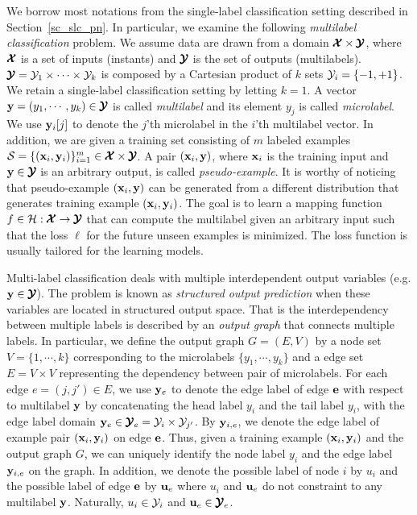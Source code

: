 {We borrow most notations from the single-label classification setting described in Section~\ref{sc_slc_pn}.
In particular, we examine the following \textit{multilabel classification} problem.
We assume data are drawn from a domain $\pmb {\mathcal{X}}\times\pmb {\mathcal{Y}}$, where $\pmb {\mathcal{X}}$ is a set of inputs (instants) and $\pmb {\mathcal{Y}}$ is the set of outputs (multilabels).
$\pmb {\mathcal{Y}} = \mathcal{Y}_1\times\cdots\times\mathcal{Y}_k$ is composed by a Cartesian product of $k$ sets $\mathcal{Y}_i=\{-1,+1\}$.
We retain a single-label classification setting by letting $k=1$.
A vector $\mathbf {y}=(y_1,\cdots,y_k)\in\pmb {\mathcal{Y}}$ is called \textit{multilabel} and its element $y_j$ is called \textit{microlabel}.
We use $\mathbf {y}_i[j]$ to denote the $j$'th microlabel in the $i$'th multilabel vector.
In addition, we are given a training set consisting of $m$ labeled examples $\mathcal{S}=\{(\mathbf {x}_i,\mathbf {y}_i)\}_{i=1}^{m}\in\pmb {\mathcal{X}}\times\pmb {\mathcal{Y}}$. 
A pair $(\mathbf {x}_i,\mathbf {y})$, where $\mathbf {x}_i$ is the training input and $\mathbf {y}\in\pmb {\mathcal{Y}}$ is an arbitrary output, is called \textit{pseudo-example}.
It is worthy of noticing that pseudo-example $(\mathbf {x}_i,\mathbf {y})$ can be generated from a different distribution that generates training example $(\mathbf {x}_i,\mathbf {y}_i)$.
The goal is to learn a mapping function $f\in\mathcal{H}:\pmb {\mathcal{X}}\rightarrow\pmb {\mathcal{Y}}$ that can compute the multilabel given an arbitrary input such that the loss $\ell$ for the future unseen examples is minimized.
The loss function is usually tailored for the learning models.

Multi-label classification deals with multiple interdependent output variables (e.g. $\mathbf {y}\in\pmb {\mathcal{Y}}$).
The problem is known as \textit{structured output prediction} when these variables are located in structured output space.
That is the interdependency between multiple labels is described by an \textit{output graph} that connects multiple labels.
In particular, we define the output graph $G=(E,V)$ by a node set $V=\{1,\cdots,k\}$ corresponding to the microlabels $\{y_1,\cdots,y_k\}$ and a edge set $E=V\times V$ representing the dependency between pair of microlabels.
For each edge $e=(j,j')\in E$, we use $\mathbf {y}_e$ to denote the edge label of edge $\mathbf {e}$ with respect to multilabel $\mathbf {y}$ by concatenating the head label $y_i$ and the tail label $y_i$, with the edge label domain $\mathbf {y}_e\in\pmb {\mathcal{Y}}_e=\mathcal{Y}_i\times\mathcal{Y}_{j'}$.
By $\mathbf {y}_{i,e}$, we denote the edge label of example pair $(\mathbf {x}_i,\mathbf {y}_i)$ on edge $\mathbf {e}$.
Thus, given a training example $(\mathbf {x}_i,\mathbf {y}_i)$ and the output graph $G$, we can uniquely identify the node label $y_i$ and the edge label $\mathbf {y}_{i,e}$ on the graph.
In addition, we denote the possible label of node $i$ by $u_i$ and the possible label of edge $\mathbf {e}$ by $\mathbf {u}_{e}$ where $u_i$ and $\mathbf {u}_{e}$ do not constraint to any multilabel $\mathbf {y}$.
Naturally, $u_i\in\mathcal{Y}_i$ and $\mathbf {u}_e\in\pmb {\mathcal{Y}}_e$.



}
